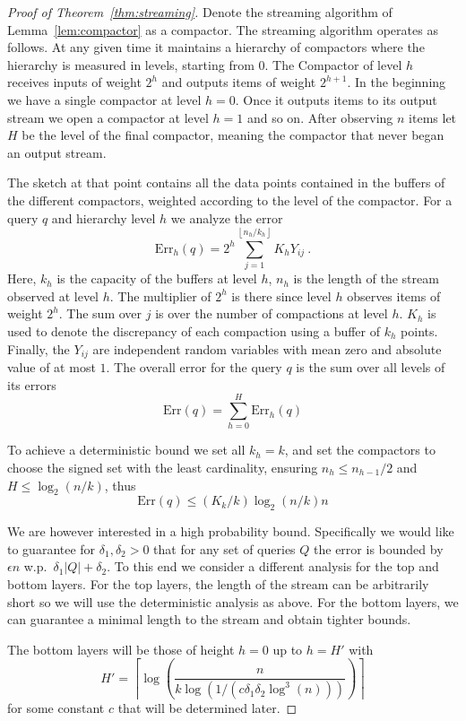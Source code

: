\documentclass[anon,12pt]{colt2019} %
\newcommand{\eps}{\epsilon}
\newcommand{\floor}[1]{\left \lfloor #1 \right \rfloor}
\newcommand{\ceil}[1]{\left \lceil #1 \right \rceil}
\begin{document}
\begin{proof} [Proof of Theorem~\ref{thm:streaming}]
Denote the streaming algorithm of Lemma~\ref{lem:compactor} as a compactor. The streaming algorithm operates as follows. At any given time it maintains a hierarchy of compactors where the hierarchy is measured in levels, starting from 0. The Compactor of level $h$ receives inputs of weight $2^h$ and outputs items of weight $2^{h+1}$. In the beginning we have a single compactor at level $h=0$. Once it outputs items to its output stream we open a compactor at level $h=1$ and so on. After observing $n$ items let $H$ be the level of the final compactor, meaning the compactor that never began an output stream.

The sketch at that point contains all the data points contained in the buffers of the different compactors, weighted according to the level of the compactor. For a query $q$ and hierarchy level $h$ we analyze the error
$$\text{Err}_h(q) = 2^h \sum_{j=1}^{\floor{n_h/k_h} } K_h Y_{ij} \ .$$
Here, $k_h$ is the capacity of the buffers at level $h$, $n_h$ is the length of the stream observed at level $h$. The multiplier of $2^h$ is there since level $h$ observes items of weight $2^h$. The sum over $j$ is over the number of compactions at level $h$. $K_h$ is used to denote the discrepancy of each compaction using a buffer of $k_h$ points. Finally, the $Y_{ij}$ are independent random variables with mean zero and absolute value of at most $1$. The overall error for the query $q$ is the sum over all levels of its errors
$$ \text{Err}(q) = \sum_{h=0}^H \text{Err}_h(q)$$

To achieve a deterministic bound we set all $k_h=k$, and set the compactors to choose the signed set with the least cardinality, ensuring $n_h \leq n_{h-1}/2$ and $H \leq \log_2(n/k)$, thus
$$ \text{Err}(q) \leq (K_k/k) \log_2(n/k) n $$

We are however interested in a high probability bound. Specifically we would like to guarantee for $\delta_1,\delta_2 > 0$ that for any set of queries $Q$ the error is bounded by $\eps n$ w.p.\ $\delta_1|Q| + \delta_2$. To this end we consider a different analysis for the top and bottom layers. For the top layers, the length of the stream can be arbitrarily short so we will use the deterministic analysis as above. For the bottom layers, we can guarantee a minimal length to the stream and obtain tighter bounds.

The bottom layers will be those of height $h=0$ up to $h=H'$ with 
\begin{equation} \label{eq:Htag}
H' = \ceil{\log\left( \frac{n}{k\log\left(1/\left(c \delta_1 \delta_2 \log^3(n)\right)\right)} \right)}
\end{equation}
for some constant $c$ that will be determined later.


\end{proof}
\end{document}
